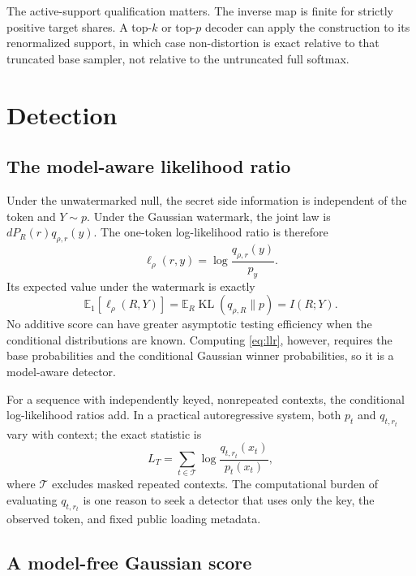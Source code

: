 \documentclass[11pt]{article}
\theoremstyle{definition}
\theoremstyle{remark}
\DeclareMathOperator{\KL}{KL}
\newcommand{\E}{\mathbb{E}}
\begin{document}
The active-support qualification matters. The inverse map is finite for strictly positive target shares. A top-$k$ or top-$p$ decoder can apply the construction to its renormalized support, in which case non-distortion is exact relative to that truncated base sampler, not relative to the untruncated full softmax.

\section{Detection}
\label{sec:detection}

\subsection{The model-aware likelihood ratio}

Under the unwatermarked null, the secret side information is independent of the token and $Y\sim p$. Under the Gaussian watermark, the joint law is $dP_R(r)q_{\rho,r}(y)$. The one-token log-likelihood ratio is therefore
\begin{equation}
\ell_\rho(r,y)=\log\frac{q_{\rho,r}(y)}{p_y}.
\label{eq:llr}
\end{equation}
Its expected value under the watermark is exactly
\begin{equation}
\E_1[\ell_\rho(R,Y)]
=\E_R\KL(q_{\rho,R}\|p)
=I(R;Y).
\label{eq:llr-mi}
\end{equation}
No additive score can have greater asymptotic testing efficiency when the conditional distributions are known. Computing \eqref{eq:llr}, however, requires the base probabilities and the conditional Gaussian winner probabilities, so it is a model-aware detector.

For a sequence with independently keyed, nonrepeated contexts, the conditional log-likelihood ratios add. In a practical autoregressive system, both $p_t$ and $q_{t,r_t}$ vary with context; the exact statistic is
\begin{equation}
L_T=\sum_{t\in\mathcal T}
\log\frac{q_{t,r_t}(x_t)}{p_t(x_t)},
\label{eq:sequence-llr}
\end{equation}
where $\mathcal T$ excludes masked repeated contexts. The computational burden of evaluating $q_{t,r_t}$ is one reason to seek a detector that uses only the key, the observed token, and fixed public loading metadata.

\subsection{A model-free Gaussian score}
\end{document}
